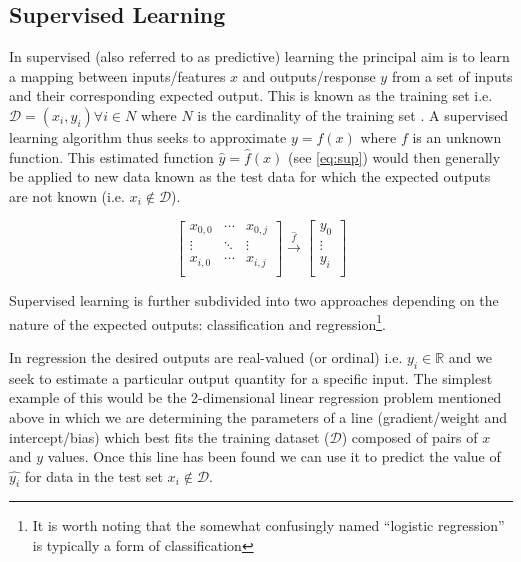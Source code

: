 \subsection{Supervised Learning}

In supervised (also referred to as predictive) learning the principal aim is 
to learn a mapping between inputs/features \(x\) and outputs/response \(y\) from a set of 
inputs and their corresponding expected output.  This is known as the training set 
i.e. \(\mathcal{D} = {(x_{i}, y_{i}) \forall i \in N}\) where \(N\) is 
the cardinality of the training set \citep{Murphy2012}.  
A supervised learning algorithm thus seeks to approximate \(y=f(x)\) where \(f\) is an unknown 
function. This estimated function \(\hat{y} = \hat{f}(x)\) (see \ref{eq:sup}) would then generally
be applied to new data known as the test data for which the expected outputs are not known (i.e. 
\(x_{i} \not \in \mathcal{D}\)).

\[
    \begin{bmatrix}
        x_{0,0} & \cdots & x_{0,j}\\
        \vdots & \ddots & \vdots \\
        x_{i,0} & \cdots & x_{i,j}\\
    \end{bmatrix} \overset{\hat{f}}{\rightarrow} \begin{bmatrix}
        y_{0} \\
        \vdots \\
        y_{i} \\
    \end{bmatrix}
    \label{eq:sup}
\]

Supervised learning is further subdivided into two approaches depending on the nature of the expected
outputs: classification and regression\footnote{It is worth noting that the somewhat confusingly named
    ``logistic regression'' is typically a form of classification}.

In regression the desired outputs are real-valued (or ordinal) i.e. \(y_{i} \in \mathbb{R}\) and we seek to
estimate a particular output quantity for a specific input.
The simplest example of this would be the 2-dimensional linear regression problem mentioned above in which
we are determining the parameters of a line (gradient/weight and intercept/bias) which best fits the training 
dataset (\(\mathcal{D}\)) composed of pairs of \(x\) and \(y\) values.  Once this line has been found we 
can use it to predict the value of \(\hat{y_{i}}\) for data in the test set \(x_{i} \not \in \mathcal{D}\).


